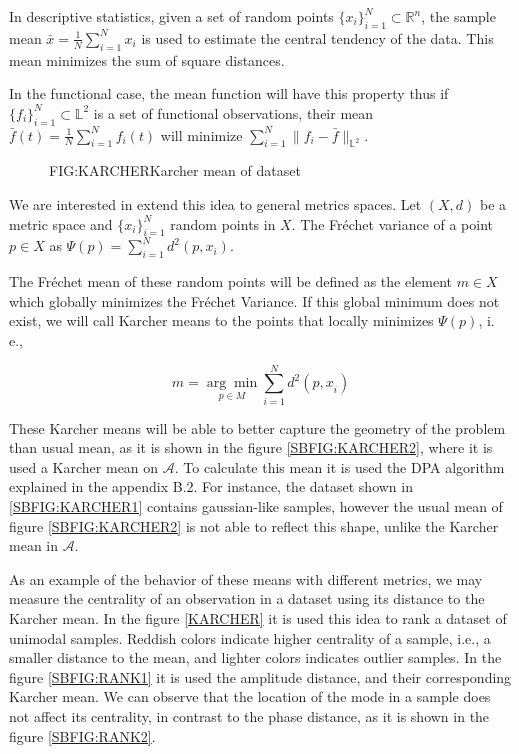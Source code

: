 In descriptive statistics, given a set of random points
$\{x_i\}_{i=1}^{N} \subset \mathbb{R}^n$, the sample mean
$\bar x = \frac{1}{N}\sum_{i=1}^{N} x_i$ is used to estimate the central
tendency of the data. This mean minimizes the sum of square distances.

In the functional case, the mean function will have this property thus if
$\{f_i\}_{i=1}^{N} \subset \mathbb{L}^2$ is a set of functional observations,
their mean $\bar f(t) = \frac{1}{N}\sum_{i=1}^{N} f_i(t)$ will minimize
$\sum_{i=1}^{N}\|f_i - \bar f\|_{\mathbb{L}^2}$.

\begin{figure}[Karcher mean of dataset]{FIG:KARCHER}{Karcher mean of dataset}
	 \quad
	 \\
	 \quad
\end{figure}

We are interested in extend this idea to general metrics spaces.
Let $(X, d)$ be a metric space and $\{x_i\}_{i=1}^{N}$ random points in $X$.
The Fréchet variance of a point $p \in X$ as $\Psi(p)=\sum_{i=1}^{N} d^{2}\left(p, x_{i}\right)$.

The Fréchet mean of these random points will be defined as the element $m \in X$
which globally minimizes the Fréchet Variance. If this global minimum does not
exist, we will call Karcher means to the points that locally minimizes
$\Psi(p)$, i. e.,

$$
m=\underset{p \in M}{\arg \min } \sum_{i=1}^{N} d^{2}\left(p, x_{\dot{i}}\right)
$$

These Karcher means will be able to better capture the geometry of the problem
than usual mean, as it is shown in the figure \ref{SBFIG:KARCHER2}, where it is
used a Karcher mean on $\mathscr{A}$.
To calculate this mean it is used the DPA algorithm explained in the appendix B.2.
For instance, the dataset shown in \ref{SBFIG:KARCHER1} contains gaussian-like
samples, however the usual mean of figure \ref{SBFIG:KARCHER2} is not able to reflect
this shape, unlike the Karcher mean in $\mathscr{A}$.



As an example of the behavior of these means with different metrics, we may
measure the centrality of an observation in a dataset using its distance to the
Karcher mean. In the figure \ref{KARCHER} it is used this idea to rank a dataset of
unimodal samples. Reddish colors indicate higher centrality of a sample, i.e.,
a smaller distance to the mean, and lighter colors indicates outlier samples.
In the figure \ref{SBFIG:RANK1} it is used the amplitude distance, and their
corresponding Karcher mean. We can observe that the location of the mode in a
sample does not affect its centrality, in contrast to the phase distance,
as it is shown in the figure \ref{SBFIG:RANK2}.
